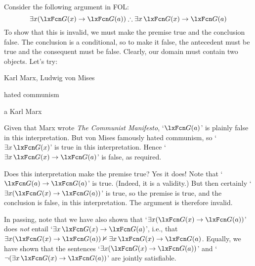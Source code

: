 Consider the following argument in FOL:
$$\exists x(\atom{G}{x} \eif \atom{G}{a}) \therefore \exists x\, \atom{G}{x} \eif \atom{G}{a}$$
To show that this is invalid, we must make the premise true and the conclusion false. The conclusion is a conditional, so to make it false, the antecedent must be true and the consequent must be false. Clearly, our domain must contain two objects. Let's try:
	\begin{ekey}
		\item[\text{domain}] Karl Marx, Ludwig von Mises
		\item[\atom{G}{x}]  hated communism
		\item[a] Karl Marx
	\end{ekey}
Given that Marx wrote \emph{The Communist Manifesto}, `$\atom{G}{a}$' is plainly false in this interpretation. But von Mises famously hated communism, so `$\exists x\, \atom{G}{x}$' is true in this interpretation. Hence `$\exists x\, \atom{G}{x} \eif \atom{G}{a}$' is false, as required.

Does this interpretation make the premise true? Yes it does! Note that `$\atom{G}{a} \eif \atom{G}{a}$' is true. (Indeed, it is a validity.) But then certainly `$\exists x (\atom{G}{x} \eif \atom{G}{a})$' is true, so the premise is true, and the conclusion is false, in this interpretation. The argument is therefore invalid.

In passing, note that we have also shown that `$\exists x(\atom{G}{x} \eif \atom{G}{a})$' does \emph{not} entail `$\exists x\, \atom{G}{x} \eif \atom{G}{a}$', i.e., that $\exists x (\atom{G}{x} \eif \atom{G}{a}) \nentails \exists x\, \atom{G}{x} \eif \atom{G}{a}$. Equally, we have shown that the sentences `$\exists x (\atom{G}{x} \eif \atom{G}{a})$' and `$\enot (\exists x\, \atom{G}{x} \eif \atom{G}{a})$' are jointly satisfiable.

